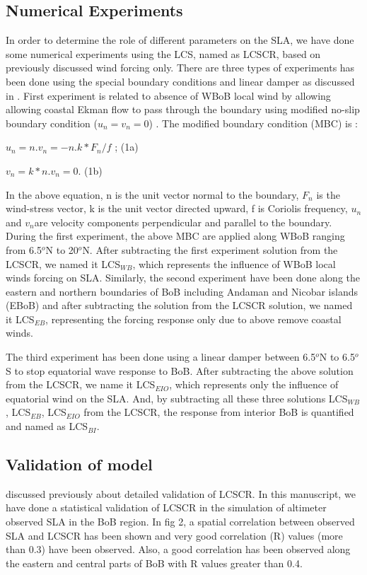 \documentclass[review]{elsarticle}
\begin{document}
\subsection{Numerical Experiments}
In order to determine the role of different parameters on the SLA, we have done some numerical experiments using the LCS, named as LCSCR, based on previously discussed wind forcing only. There are three types of experiments has been done using the special boundary conditions and linear damper as discussed in \cite{mccreary1996dynamics, mukherjee2017numerical, mukherjee2019signature}. First experiment is related to absence of WBoB local wind by allowing allowing coastal Ekman flow to pass through the boundary using modified no-slip boundary condition ($u_n=v_n=0$) . The modified boundary condition (MBC) is :
\par
$u_n=n.v_n=-n.k * F_n/f$ ;  (1a)
\par
$v_n=k* n.v_n=0$.   (1b)

In the above equation, n is the unit vector normal to the boundary, $F_n$ is the wind-stress vector, k is the unit vector directed upward, f is Coriolis frequency, $u_n$ and $v_n$are velocity components perpendicular and parallel to the boundary. During the first experiment, the above MBC are applied along WBoB ranging from 6.5$^o$N to 20$^o$N. After subtracting the first experiment solution from the LCSCR, we named it LCS$_{WB}$, which represents the influence of WBoB local winds forcing on SLA. Similarly, the second experiment have been done along the eastern and northern boundaries of  BoB including Andaman and Nicobar islands (EBoB)  and after subtracting the solution from the LCSCR solution, we named it LCS$_{EB}$, representing the forcing response only due to above remove coastal winds.

The third experiment has been done using a linear damper between 6.5$^o$N to 6.5$^o$S to stop equatorial wave response to BoB. After subtracting the above solution from the LCSCR, we name it LCS$_{EIO}$, which represents only the influence of equatorial wind on the SLA. And, by subtracting all these three solutions LCS$_{WB}$, LCS$_{EB}$, LCS$_{EIO}$ from the LCSCR, the response from interior BoB is quantified and named as LCS$_{BI}$.   

\subsection{Validation of model}
\cite{shankar2010minima,aparna2012signatures,mukherjee2017numerical,mukherjee2019signature} discussed previously about detailed validation of LCSCR. In this manuscript, we have done a statistical validation of LCSCR in the simulation of altimeter observed SLA in the BoB region. In fig 2, a spatial correlation between observed SLA and LCSCR has been shown and very good correlation (R) values (more than 0.3) have been observed. Also, a good correlation has been observed along the eastern and central parts of BoB with R values greater than 0.4. 
\end{document}
